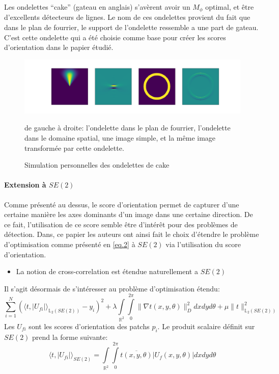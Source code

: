 \documentclass{article}
\begin{document}
Les ondelettes ``cake'' (gateau en anglais) s'avèrent avoir un $ M_{\phi} $ optimal, et
être d'excellents détecteurs de lignes. Le nom de ces ondelettes provient du fait que
dans le plan de fourrier, le support de l'ondelette ressemble a une part de gateau.
C'est cette ondelette qui a été choisie comme base pour créer les scores d'orientation
dans le papier étudié.
\vspace{5em}
\begin{figure}[htpb]
\centering
\hspace*{-6em}
\includegraphics[scale=0.39]{plots/cake_wavelet.png}
\caption {Simulation personnelles des ondelettes de  cake}
de gauche à droite: l'ondelette dans le plan de fourrier, l'ondelette dans le domaine
spatial, une image simple, et la même image transformée par cette ondelette.
\end{figure}

\paragraph{Extension à $SE(2)$}
Comme présenté au dessus, le score d'orientation permet de capturer d'une certaine manière les axes dominants d'un image dans une certaine direction. De ce fait, 
l'utilisation de ce score semble être d'intérêt pour des problèmes de détection.
Dans, ce papier les auteurs ont ainsi fait le choix d'étendre le problème d'optimisation comme présenté en \ref{eq.2} à $SE(2)$ via 
l'utilisation du score d'orientation. 
\begin{itemize}
  \item La notion de cross-correlation est étendue naturellement a $ SE(2) $
\end{itemize}
Il s'agit désormais de s'intéresser au problème d'optimisation étendu:
\[
  \sum \limits_{i=1}^N (\langle t, |U_{fi}| \rangle_{{\mathbb{L}_2(SE(2))}} - y_i)^2 + \lambda \int \limits_{\mathbb{R}^2} \int \limits_{0}^{2\pi} \lVert 
  \nabla t(x, y, \theta)\rVert_{D}^2 dxdyd\theta + \mu \lVert t \rVert_{\mathbb{L}_2(SE(2))}^2
\]
Les $U_{fi}$ sont les scores d'orientation des patchs $p_i$.
Le produit scalaire définit sur $SE(2)$ prend la forme suivante:
\[
    \langle t, |U_{fi}| \rangle_{SE(2)} = 
    \int \limits_{\mathbb{R}^2} \int \limits_{0}^{2\pi} \overline{t(x, y, \theta)} \lvert U_f (x, y, \theta) \rvert dxdyd\theta
\]
\end{document}
